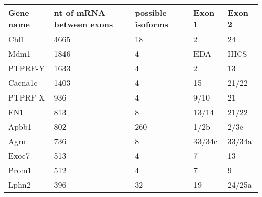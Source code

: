 \begin{table}[h]
\begin{tabular}{|l|l|l|l|l|}
\hline
\textbf{Gene name} & \textbf{nt of mRNA between exons} & \textbf{possible isoforms} & \textbf{Exon 1} & \textbf{Exon 2} \\ \hline
Chl1               & 4665                              & 18                         & 2               & 24              \\ \hline
Mdm1               & 1846                              & 4                          & EDA             & IIICS           \\ \hline
PTPRF-Y            & 1633                              & 4                          & 2               & 13              \\ \hline
Cacna1c            & 1403                              & 4                          & 15              & 21/22           \\ \hline
PTPRF-X            & 936                               & 4                          & 9/10            & 21              \\ \hline
FN1                & 813                               & 8                          & 13/14           & 21/22           \\ \hline
Apbb1              & 802                               & 260                        & 1/2b            & 2/3e            \\ \hline
Agrn               & 736                               & 8                          & 33/34c          & 33/34a          \\ \hline
Exoc7              & 513                               & 4                          & 7               & 13              \\ \hline
Prom1              & 512                               & 4                          & 7               & 9               \\ \hline
Lphn2              & 396                               & 32                         & 19              & 24/25a          \\ \hline
\end{tabular}
\end{table}